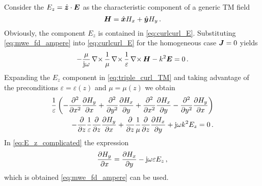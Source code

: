 Consider the $E_z = \uv{z} \cdot \pvec{E}$ as the characteristic component
of a generic \ac{TM} field
\begin{equation}\label{eq:TE_E_field_components}
	\pvec{H} = \uv{x}H_x + \uv{y}H_y \,.
\end{equation}
Obviously, the component $E_z$ is contained in \eqref{eq:curlcurl_E}.
Substituting \eqref{eq:mwe_fd_ampere} into \eqref{eq:curlcurl_E} for the
homogeneous case $\pvec{J}  = 0$ yields
\begin{equation}\label{eq:triple_curl_TM}
	- \frac{\mu}{\im \omega}
	\curl \frac{1}{\mu}
	\curl \frac{1}{\varepsilon} \curl \pvec{H} - k^2\pvec{E} = 0
	\,.
\end{equation}
Expanding the $E_z$ component in \eqref{eq:triple_curl_TM} and taking advantage
of the preconditions $\varepsilon = \varepsilon\left(z\right)$ and
$\mu = \mu\left(z\right)$ we obtain
\begin{equation}\label{eq:E_z_complicated}
	\begin{split}
		\frac{1}{\varepsilon}
		\left(
			-\pdsec{x} \pd[H_y]{x} +
			\pdsec{y} \pd[H_x]{y} +
			\pdsec{x} \pd[H_x]{y} -
			\pdsec{y} \pd[H_y]{x}
		\right) \\
		-\pd{z}\frac{1}{\varepsilon}\pd{z}\pd[H_y]{x} +
		\pd{z}\frac{1}{\mu}\pd{z}\pd[H_x]{y} +
		\im \omega k^2 E_z = 0
		\,.
	\end{split}
\end{equation}
In \eqref{eq:E_z_complicated} the expression
\begin{equation}
	\pd[H_y]{x} = \pd[H_x]{y} - \im \omega \varepsilon E_z
	\, ,
\end{equation}
which is obtained \eqref{eq:mwe_fd_ampere} can be used.


